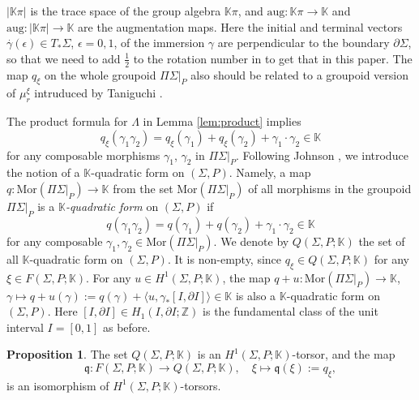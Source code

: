 \documentclass[a4paper,12pt, twoside]{amsart}
\theoremstyle{definition}
\newtheorem{prop}[dfn]{Proposition}
\theoremstyle{remark}
\numberwithin{equation}{section}
\newcommand\bK{{\mathbb{K}}}
\newcommand\bZ{{\mathbb{Z}}}
\newcommand\La{\Lambda}
\newcommand\Mor{\mathrm{Mor}}
\newcommand\pa{\partial}
\begin{document}
$|\bK\pi|$ is the trace space of the group algebra $\bK\pi$, 
and $\mathrm{aug}: \bK\pi \to \bK$ and $\mathrm{aug}: |\bK\pi| \to \bK$ are the augmentation maps. 
Here the initial and terminal vectors $\overset\cdot{\gamma}(\epsilon) \in T_\ast\Sigma$, $\epsilon = 0,1$, of the immersion $\gamma$ are perpendicular to the boundary $\pa\Sigma$, so that we need to add $\frac12$ to the rotation number in \cite{AKKNb} to get that in this paper. 
The map $q_\xi$ on the whole groupoid $\Pi\Sigma\vert_P$ also should be related to a groupoid version of $\mu^\xi_r$ intruduced by Taniguchi \cite{Tan25b}. \par
The product formula for $\La$ in Lemma \ref{lem:product} implies
\begin{equation}\label{eq:qprod}
q_\xi(\gamma_1\gamma_2) = q_\xi(\gamma_1) + q_\xi(\gamma_2) + \gamma_1\cdot\gamma_2 \in \bK
\end{equation}
for any composable morphisms $\gamma_1$, $\gamma_2$ in $\Pi\Sigma\vert_P$. 
Following Johnson \cite{J80a}, we introduce the notion of a $\bK$-quadratic form on $(\Sigma, P)$. 
Namely, a map $q: \Mor(\Pi\Sigma\vert_P) \to \bK$ from the set $\Mor(\Pi\Sigma\vert_P)$ of all morphisms in the groupoid $\Pi\Sigma\vert_P$ is a {\it $\bK$-quadratic form} on $(\Sigma, P)$ if 
$$
q(\gamma_1\gamma_2) = q(\gamma_1) + q(\gamma_2) + \gamma_1\cdot \gamma_2 \in \bK
$$
for any composable $\gamma_1, \gamma_2 \in \Mor(\Pi\Sigma\vert_P)$. 
We denote by $Q(\Sigma, P; \bK)$ the set of all $\bK$-quadratic form on $(\Sigma, P)$. 
It is non-empty, since $q_\xi \in Q(\Sigma, P; \bK)$ for any $\xi \in F(\Sigma, P; \bK)$. 
For any $u \in H^1(\Sigma, P; \bK)$, the map $q+u: \Mor(\Pi\Sigma\vert_P) \to \bK$, 
$\gamma \mapsto q+u(\gamma) := q(\gamma) + \langle u,  \gamma_*[I, \pa I]\rangle \in \bK$ is also a $\bK$-quadratic form on $(\Sigma, P)$. 
Here $[I, \pa I] \in H_1(I, \pa I; \bZ)$ is the fundamental class of the unit interval $I = [0,1]$ as before. 
\begin{prop}\label{prop:FQ} The set $Q(\Sigma, P; \bK)$ is an $H^1(\Sigma, P; \bK)$-torsor, and the map 
$$
\mathfrak{q}: F(\Sigma, P; \bK) \to Q(\Sigma, P; \bK), \quad \xi \mapsto \mathfrak{q}(\xi) := q_\xi,
$$
is an isomorphism of $H^1(\Sigma, P; \bK)$-torsors.
\end{prop}
\end{document}
